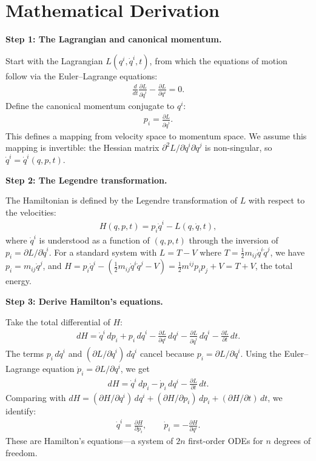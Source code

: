 \documentclass[11pt,openright]{book}
\begin{document}
\section*{Mathematical Derivation}

\textbf{Step 1: The Lagrangian and canonical momentum.}

Start with the Lagrangian $L(q^i, \dot{q}^i, t)$, from which the equations of motion follow via the Euler--Lagrange equations:
\begin{align}
\frac{d}{dt}\frac{\partial L}{\partial\dot{q}^i} - \frac{\partial L}{\partial q^i} = 0.
\end{align}
Define the canonical momentum conjugate to $q^i$:
\begin{align}
p_i = \frac{\partial L}{\partial\dot{q}^i}.
\end{align}
This defines a mapping from velocity space to momentum space. We assume this mapping is invertible: the Hessian matrix $\partial^2 L/\partial\dot{q}^i\partial\dot{q}^j$ is non-singular, so $\dot{q}^i = \dot{q}^i(q, p, t)$.

\textbf{Step 2: The Legendre transformation.}

The Hamiltonian is defined by the Legendre transformation of $L$ with respect to the velocities:
\begin{align}
H(q, p, t) = p_i\dot{q}^i - L(q, \dot{q}, t),
\end{align}
where $\dot{q}^i$ is understood as a function of $(q, p, t)$ through the inversion of $p_i = \partial L/\partial\dot{q}^i$. For a standard system with $L = T - V$ where $T = \frac{1}{2}m_{ij}\dot{q}^i\dot{q}^j$, we have $p_i = m_{ij}\dot{q}^j$, and $H = p_i\dot{q}^i - (\frac{1}{2}m_{ij}\dot{q}^i\dot{q}^j - V) = \frac{1}{2}m^{ij}p_ip_j + V = T + V$, the total energy.

\textbf{Step 3: Derive Hamilton's equations.}

Take the total differential of $H$:
\begin{align}
dH = \dot{q}^i\,dp_i + p_i\,d\dot{q}^i - \frac{\partial L}{\partial q^i}\,dq^i - \frac{\partial L}{\partial\dot{q}^i}\,d\dot{q}^i - \frac{\partial L}{\partial t}\,dt.
\end{align}
The terms $p_i\,d\dot{q}^i$ and $(\partial L/\partial\dot{q}^i)\,d\dot{q}^i$ cancel because $p_i = \partial L/\partial\dot{q}^i$. Using the Euler--Lagrange equation $\dot{p}_i = \partial L/\partial q^i$, we get
\begin{align}
dH = \dot{q}^i\,dp_i - \dot{p}_i\,dq^i - \frac{\partial L}{\partial t}\,dt.
\end{align}
Comparing with $dH = (\partial H/\partial q^i)\,dq^i + (\partial H/\partial p_i)\,dp_i + (\partial H/\partial t)\,dt$, we identify:
\begin{align}
\boxed{\dot{q}^i = \frac{\partial H}{\partial p_i}, \qquad \dot{p}_i = -\frac{\partial H}{\partial q^i}.}
\end{align}
These are Hamilton's equations---a system of $2n$ first-order ODEs for $n$ degrees of freedom.
\end{document}
